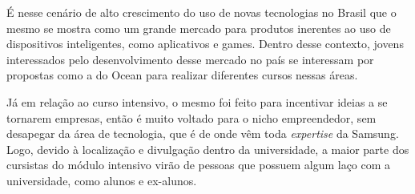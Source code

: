 É nesse cenário de alto crescimento do uso de novas tecnologias no Brasil que o mesmo se mostra como um grande mercado para produtos inerentes ao uso de dispositivos inteligentes, como aplicativos e games. Dentro desse contexto, jovens interessados pelo desenvolvimento desse mercado no país se interessam por propostas como a do Ocean para realizar diferentes cursos nessas áreas.

Já em relação ao curso intensivo, o mesmo foi feito para incentivar ideias a se tornarem empresas, então é muito voltado para o nicho empreendedor, sem desapegar da área de tecnologia, que é de onde vêm toda \textit{expertise} da Samsung. Logo, devido à localização e divulgação dentro da universidade, a maior parte dos cursistas do módulo intensivo virão de pessoas que possuem algum laço com a universidade, como alunos e ex-alunos.